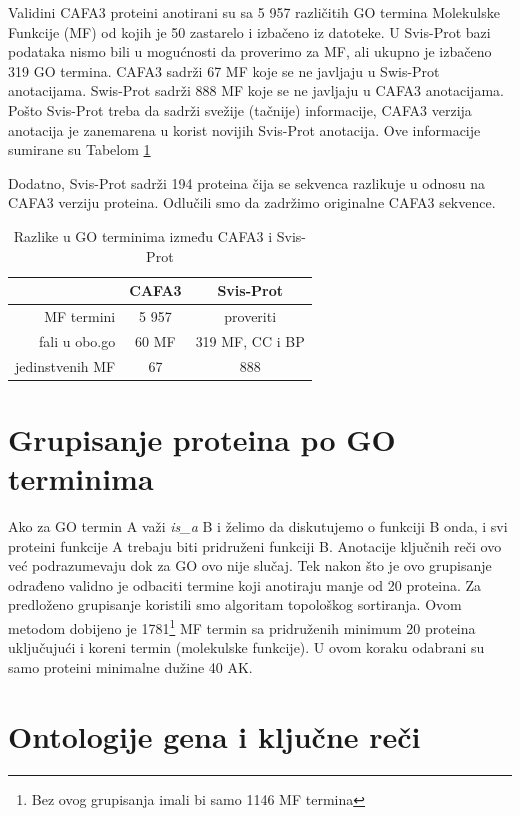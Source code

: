 Validini CAFA3 proteini anotirani su sa  5 957 različitih GO termina Molekulske
Funkcije (MF) od kojih je 50 zastarelo i izbačeno iz  datoteke.  U
Svis-Prot bazi podataka nismo bili u mogućnosti da proverimo za MF, ali ukupno
je izbačeno 319 GO termina.
CAFA3 sadrži 67 MF koje se ne javljaju u Swis-Prot anotacijama.
Swis-Prot sadrži 888 MF koje se ne javljaju u CAFA3 anotacijama.
Pošto Svis-Prot treba da sadrži svežije (tačnije) informacije, CAFA3 verzija
anotacija je zanemarena u korist novijih Svis-Prot anotacija. Ove informacije
sumirane su  Tabelom \ref{tab:godiff}

Dodatno, Svis-Prot sadrži 194 proteina čija se sekvenca razlikuje u
odnosu na CAFA3 verziju proteina. Odlučili smo da zadržimo originalne CAFA3
sekvence.

\begin{table}[htpb]
  \centering
  \caption{Razlike u GO terminima između CAFA3 i Svis-Prot}
  \label{tab:godiff}
\begin{tabular}{|r|c|c|}
  \hline
                  & CAFA3 & Svis-Prot       \\
  \hline
  MF termini      & 5 957 &    proveriti    \\
  fali u obo.go   & 60 MF & 319 MF, CC i BP \\
  jedinstvenih MF & 67    & 888             \\
  \hline
\end{tabular}
\end{table}

\section{Grupisanje proteina po GO terminima}

Ako za GO termin A važi \textit{is\_a} B i želimo da diskutujemo o funkciji B
onda, i svi proteini funkcije A trebaju biti pridruženi funkciji B. Anotacije
ključnih reči ovo već podrazumevaju dok za GO ovo nije slučaj. Tek nakon što je
ovo grupisanje odrađeno validno je odbaciti termine koji anotiraju manje od 20
proteina.  Za predloženo grupisanje koristili smo algoritam topološkog
sortiranja.  Ovom metodom dobijeno je 1781\footnote{Bez ovog grupisanja imali
bi samo 1146 MF termina} MF termin sa pridruženih minimum 20 proteina
uključujući i koreni termin (molekulske funkcije). U ovom koraku odabrani su
samo proteini minimalne dužine 40 AK.

\section{Ontologije gena i ključne reči}

